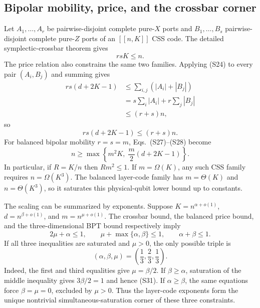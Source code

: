 \documentclass[aps,prx,reprint,superscriptaddress,nofootinbib,floatfix,longbibliography]{revtex4-2}
\theoremstyle{definition}
\begin{document}
\subsection{Bipolar mobility, price, and the crossbar corner}
Let $A_1,\ldots,A_r$ be pairwise-disjoint complete pure-$X$ ports and
$B_1,\ldots,B_s$ pairwise-disjoint complete pure-$Z$ ports of an $[[n,K]]$
CSS code.  The detailed symplectic-crossbar theorem gives
\begin{equation}
 rsK\le n. \tag{S27}
\end{equation}
The price relation also constrains the same two families.  Applying (S24) to
every pair $(A_i,B_j)$ and summing gives
\begin{align*}
 rs(d+2K-1)
 &\le \sum_{i,j}(|A_i|+|B_j|)\\
 &=s\sum_i|A_i|+r\sum_j|B_j|\\
 &\le (r+s)n,
\end{align*}
so
\begin{equation}
 rs(d+2K-1)\le(r+s)n. \tag{S28}
\end{equation}
For balanced bipolar mobility $r=s=m$, Eqs.~(S27)--(S28) become
\begin{equation}
 n\ge\max\!\left\{m^2K,\;\frac m2(d+2K-1)\right\}. \tag{S29}
\end{equation}
In particular, if $R=K/n$ then $Rm^2\le1$.  If $m=\Omega(K)$, any such CSS
family requires $n=\Omega(K^3)$.  The balanced layer-code family has
$m=\Theta(K)$ and $n=\Theta(K^3)$, so it saturates this physical-qubit lower
bound up to constants.

The scaling can be summarized by exponents.  Suppose
$K=n^{\alpha+o(1)}$, $d=n^{\beta+o(1)}$, and
$m=n^{\mu+o(1)}$.  The crossbar bound, the balanced price bound, and the
three-dimensional BPT bound respectively imply
\begin{equation}
 2\mu+\alpha\le1,\qquad
 \mu+\max\{\alpha,\beta\}\le1,\qquad
 \alpha+\beta\le1. \tag{S30}
\end{equation}
If all three inequalities are saturated and $\mu>0$, the only possible
triple is
\begin{equation}
 (\alpha,\beta,\mu)=\left(\frac13,\frac23,\frac13\right). \tag{S31}
\end{equation}
Indeed, the first and third equalities give $\mu=\beta/2$.  If
$\beta\ge\alpha$, saturation of the middle inequality gives
$3\beta/2=1$ and hence (S31).  If $\alpha\ge\beta$, the same equations force
$\beta=\mu=0$, excluded by $\mu>0$.  Thus the layer-code exponents form the
unique nontrivial simultaneous-saturation corner of these three constraints.
\end{document}
